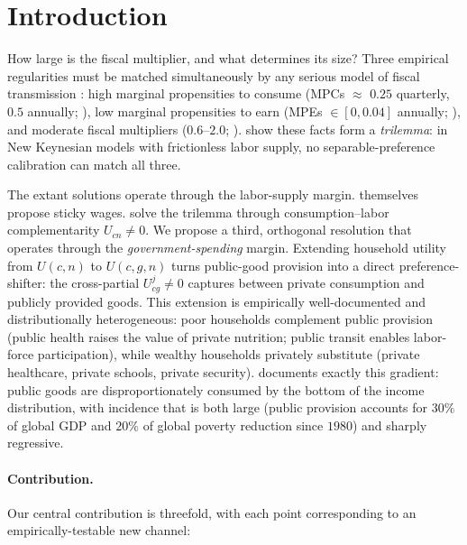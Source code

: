 \section{Introduction}\label{sec:intro}

How large is the fiscal multiplier, and what determines its size? Three
empirical regularities must be matched simultaneously by any serious model of
fiscal transmission \citep{Auclert2024}: high marginal propensities to consume
(MPCs $\approx$ $0.25$ quarterly, $0.5$ annually; \citealp{KaplanViolante2014,Fagereng2021}),
low marginal propensities to earn (MPEs $\in [0, 0.04]$ annually;
\citealp{Cesarini2017}), and moderate fiscal multipliers ($0.6$--$2.0$;
\citealp{Ramey2019,Christiano2011,Woodford2011}). \auclert{} show these facts
form a \emph{trilemma}: in New Keynesian models with frictionless labor
supply, no separable-preference calibration can match all three.

\smallskip
The extant solutions operate through the labor-supply margin. \auclert{}
themselves propose sticky wages. \BHL{} solve the trilemma through
consumption--labor complementarity $U_{cn}\neq 0$. We propose a third,
orthogonal resolution that operates through the \emph{government-spending}
margin. Extending household utility from $U(c,n)$ to $U(c,g,n)$ turns
public-good provision into a direct preference-shifter: the cross-partial
$U_{cg}^{j} \neq 0$ captures \EC{} between private consumption and publicly
provided goods. This extension is empirically well-documented
\citep{Karras1994,JallesKarras2022,FrancoisKeinsley2023,Francois2023,BarthelFrancois2025,Bilbiie2011}
and distributionally heterogeneous: poor households complement public
provision (public health raises the value of private nutrition; public
transit enables labor-force participation), while wealthy households
privately substitute (private healthcare, private schools, private
security). \citet{Gethin2023} documents exactly this gradient: public goods
are disproportionately consumed by the bottom of the income distribution,
with incidence that is both large (public provision accounts for $30\%$ of
global GDP and $20\%$ of global poverty reduction since $1980$) and sharply
regressive.

\paragraph{Contribution.} Our central contribution is threefold, with each point
corresponding to an empirically-testable new channel:

